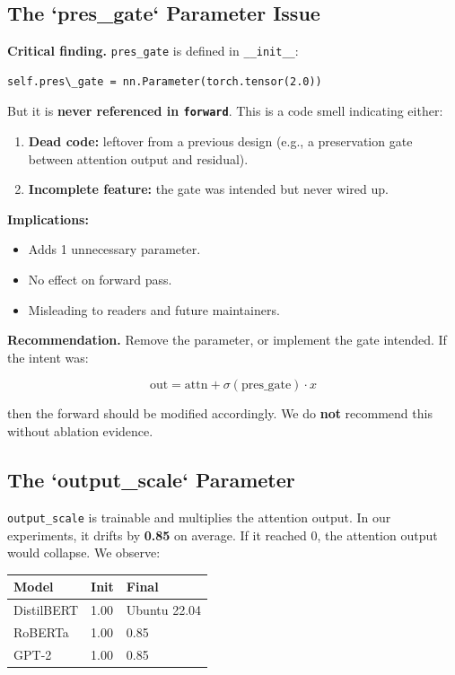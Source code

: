 \subsection{The `pres\_gate` Parameter Issue}

\textbf{Critical finding.} \texttt{pres\_gate} is defined in \texttt{\_\_init\_\_}:

\begin{lstlisting}
self.pres\_gate = nn.Parameter(torch.tensor(2.0))
\end{lstlisting}

But it is \textbf{never referenced in \texttt{forward}}. This is a code smell 
indicating either:

\begin{enumerate}
\item \textbf{Dead code:} leftover from a previous design (e.g., a preservation
  gate between attention output and residual).
\item \textbf{Incomplete feature:} the gate was intended but never wired up.

\end{enumerate}
\textbf{Implications:}

\begin{itemize}
\item Adds 1 unnecessary parameter.
\item No effect on forward pass.
\item Misleading to readers and future maintainers.

\end{itemize}
\textbf{Recommendation.} Remove the parameter, or implement the gate 
intended. If the intent was:

\[
\text{out} = \text{attn} + \sigma(\text{pres\_gate}) \cdot x
\]

then the forward should be modified accordingly. We do \textbf{not} recommend 
this without ablation evidence.

\subsection{The `output\_scale` Parameter}

\texttt{output\_scale} is trainable and multiplies the attention output. In 
our experiments, it drifts by \textbf{0.85} on average. If it 
reached 0, the attention output would collapse. We observe:

\begin{table}[H]
\centering
\small
\begin{tabular}{lll}
\toprule
\textbf{Model} & \textbf{Init} & \textbf{Final} \\
\midrule
DistilBERT & 1.00 & Ubuntu 22.04 \\
RoBERTa & 1.00 & 0.85 \\
GPT-2 & 1.00 & 0.85 \\
\bottomrule
\end{tabular}
\end{table}

